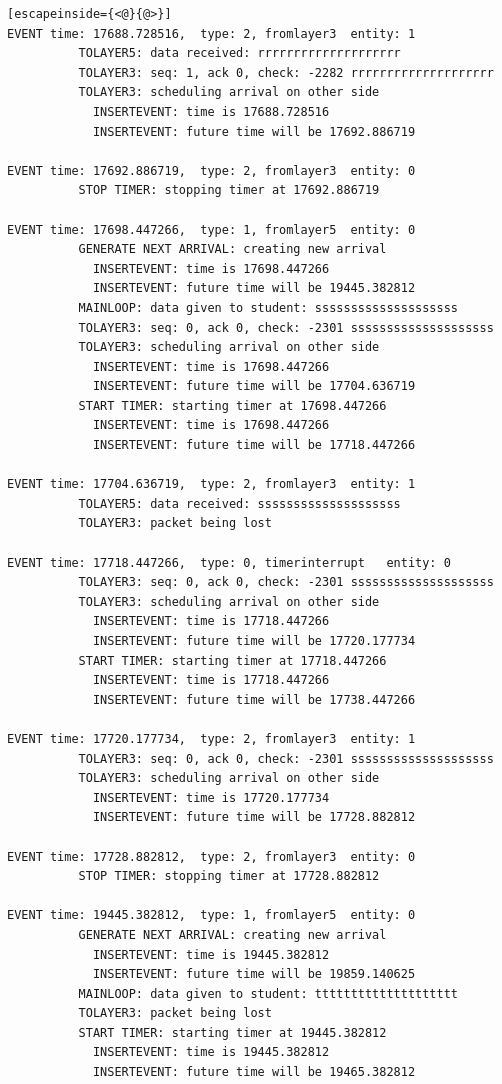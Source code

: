 \documentclass[paper=a4, fontsize=11pt]{scrartcl}
\numberwithin{equation}{section}		%
\numberwithin{figure}{section}			%
\numberwithin{table}{section}				%
\begin{document}
\begin{lstlisting}[escapeinside={<@}{@>}]
EVENT time: 17688.728516,  type: 2, fromlayer3  entity: 1
          TOLAYER5: data received: rrrrrrrrrrrrrrrrrrrr
          TOLAYER3: seq: 1, ack 0, check: -2282 rrrrrrrrrrrrrrrrrrrr
          TOLAYER3: scheduling arrival on other side
            INSERTEVENT: time is 17688.728516
            INSERTEVENT: future time will be 17692.886719

EVENT time: 17692.886719,  type: 2, fromlayer3  entity: 0
          STOP TIMER: stopping timer at 17692.886719

EVENT time: 17698.447266,  type: 1, fromlayer5  entity: 0
          GENERATE NEXT ARRIVAL: creating new arrival
            INSERTEVENT: time is 17698.447266
            INSERTEVENT: future time will be 19445.382812
          MAINLOOP: data given to student: ssssssssssssssssssss
          TOLAYER3: seq: 0, ack 0, check: -2301 ssssssssssssssssssss
          TOLAYER3: scheduling arrival on other side
            INSERTEVENT: time is 17698.447266
            INSERTEVENT: future time will be 17704.636719
          START TIMER: starting timer at 17698.447266
            INSERTEVENT: time is 17698.447266
            INSERTEVENT: future time will be 17718.447266

EVENT time: 17704.636719,  type: 2, fromlayer3  entity: 1
          TOLAYER5: data received: ssssssssssssssssssss
          TOLAYER3: packet being lost

EVENT time: 17718.447266,  type: 0, timerinterrupt   entity: 0
          TOLAYER3: seq: 0, ack 0, check: -2301 ssssssssssssssssssss
          TOLAYER3: scheduling arrival on other side
            INSERTEVENT: time is 17718.447266
            INSERTEVENT: future time will be 17720.177734
          START TIMER: starting timer at 17718.447266
            INSERTEVENT: time is 17718.447266
            INSERTEVENT: future time will be 17738.447266

EVENT time: 17720.177734,  type: 2, fromlayer3  entity: 1
          TOLAYER3: seq: 0, ack 0, check: -2301 ssssssssssssssssssss
          TOLAYER3: scheduling arrival on other side
            INSERTEVENT: time is 17720.177734
            INSERTEVENT: future time will be 17728.882812

EVENT time: 17728.882812,  type: 2, fromlayer3  entity: 0
          STOP TIMER: stopping timer at 17728.882812

EVENT time: 19445.382812,  type: 1, fromlayer5  entity: 0
          GENERATE NEXT ARRIVAL: creating new arrival
            INSERTEVENT: time is 19445.382812
            INSERTEVENT: future time will be 19859.140625
          MAINLOOP: data given to student: tttttttttttttttttttt
          TOLAYER3: packet being lost
          START TIMER: starting timer at 19445.382812
            INSERTEVENT: time is 19445.382812
            INSERTEVENT: future time will be 19465.382812


\end{lstlisting}
\end{document}
